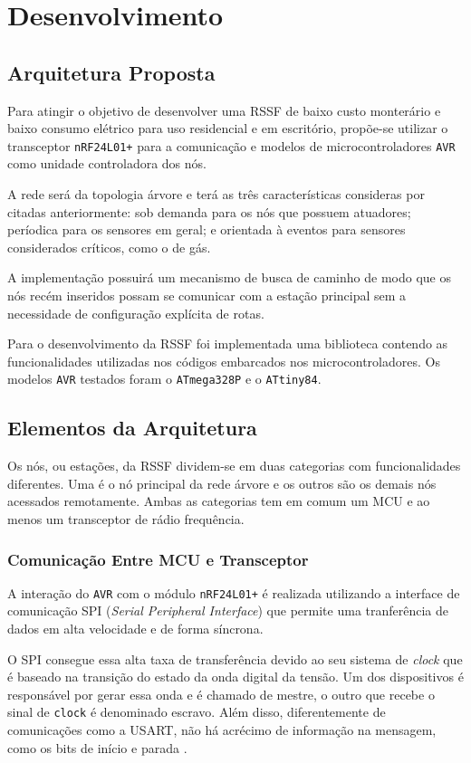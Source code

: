 \chapter{Desenvolvimento}
\label{cap:6}

\section{Arquitetura Proposta}
Para atingir o objetivo de desenvolver uma RSSF de baixo custo monterário e baixo consumo elétrico para uso
residencial e em escritório, propõe-se utilizar o transceptor \texttt{nRF24L01+} para a comunicação e modelos de
microcontroladores \texttt{AVR} como unidade controladora dos nós.

A rede será da topologia árvore e terá as três características consideras por
 citadas anteriormente: sob demanda para os nós que possuem atuadores;
períodica para os sensores em geral; e orientada à eventos para sensores considerados críticos, como o de gás.

A implementação possuirá um mecanismo de busca de caminho de modo que os nós recém inseridos possam se
comunicar com a estação principal sem a necessidade de configuração explícita de rotas.

Para o desenvolvimento da RSSF foi implementada uma biblioteca contendo as funcionalidades utilizadas nos
códigos embarcados nos microcontroladores. Os modelos \texttt{AVR} testados foram o \texttt{ATmega328P} e o
\texttt{ATtiny84}.

\section{Elementos da Arquitetura}
Os nós, ou estações, da RSSF dividem-se em duas categorias com funcionalidades diferentes. Uma é o nó
principal da rede árvore e os outros são os demais nós acessados remotamente. Ambas as categorias tem em comum
um MCU e ao menos um transceptor de rádio frequência.

\subsection{Comunicação Entre MCU e Transceptor}
A interação do \texttt{AVR} com o módulo \texttt{nRF24L01+} é realizada utilizando a interface de comunicação
SPI (\textit{Serial Peripheral Interface}) que permite uma tranferência de dados em alta velocidade e de forma
síncrona.

O SPI consegue essa alta taxa de transferência devido ao seu sistema de \textit{clock} que é baseado na
transição do estado da onda digital da tensão. Um dos dispositivos é responsável por gerar essa onda e é
chamado de mestre, o outro que recebe o sinal de \texttt{clock} é denominado escravo. Além disso,
diferentemente de comunicações como a USART, não há acrécimo de informação na mensagem, como os bits de início
e parada \cite{williams2014}.

